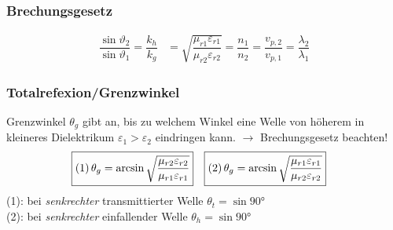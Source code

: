 \subsubsection{Brechungsgesetz}
\begin{align*}
	\dfrac{\sin \vartheta_{2}}{\sin \vartheta_{1}} = \dfrac{k_{h}}{k_{g}} & = \sqrt{\dfrac{\mu_{r 1} \varepsilon_{r 1}}{\mu_{r 2} \varepsilon_{r 2}}} = \dfrac{n_{1}}{n_{2}} = \dfrac{v_{p, 2}}{v_{p, 1}} = \dfrac{\lambda_{2}}{\lambda_{1}}
\end{align*}
\subsubsection{Totalrefexion/Grenzwinkel}
Grenzwinkel $ \theta_g $ gibt an, bis zu welchem Winkel eine Welle von höherem in kleineres Dielektrikum $ \varepsilon_1 > \varepsilon_2 $ eindringen kann. $ \rightarrow $ Brechungsgesetz beachten!
\begin{align*}
	\Aboxed{(1) \, \theta_g & = \arcsin \sqrt{\frac{\mu_{r2}\varepsilon_{r2}}{\mu_{r1}\varepsilon_{r1}}} } &
	\Aboxed{(2) \, \theta_g & = \arcsin \sqrt{ \dfrac{\mu_{r1} \varepsilon_{r1}}{\mu_{r2} \varepsilon_{r2}}}}
&
\end{align*}
(1): bei \textit{senkrechter} transmittierter Welle $ \theta_t = \sin \ang{90}$\\
(2): bei \textit{senkrechter} einfallender Welle $ \theta_h = \sin \ang{90}$

